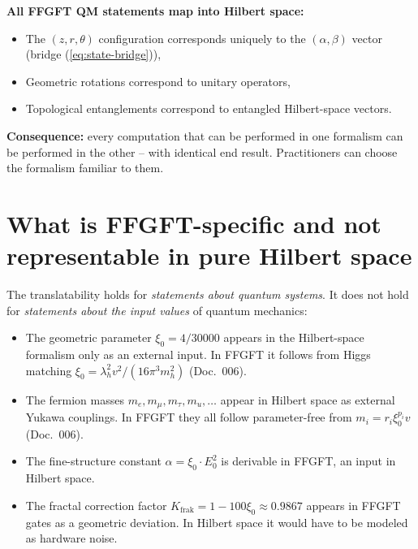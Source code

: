 \textbf{All FFGFT QM statements map into Hilbert space:}
\begin{itemize}[leftmargin=2em,itemsep=2pt,topsep=2pt]
  \item The $(z, r, \theta)$ configuration corresponds uniquely to
        the $(\alpha, \beta)$ vector (bridge (\ref{eq:state-bridge})),
  \item Geometric rotations correspond to unitary operators,
  \item Topological entanglements correspond to entangled
        Hilbert-space vectors.
\end{itemize}

\textbf{Consequence:} every computation that can be performed in one
formalism can be performed in the other -- with identical end
result. Practitioners can choose the formalism familiar to them.

\section{What is FFGFT-specific and not representable in pure Hilbert space}

The translatability holds for \emph{statements about quantum systems}.
It does not hold for \emph{statements about the input values} of
quantum mechanics:

\begin{itemize}[leftmargin=2em,itemsep=2pt,topsep=2pt]
  \item The geometric parameter $\xi_0 = 4/30000$ appears in the
        Hilbert-space formalism only as an external input. In FFGFT
        it follows from Higgs matching $\xi_0 = \lambda_h^2 v^2/
        (16\pi^3 m_h^2)$ (Doc.~006).
  \item The fermion masses $m_e, m_\mu, m_\tau, m_u, \ldots$ appear
        in Hilbert space as external Yukawa couplings. In FFGFT they
        all follow parameter-free from $m_i = r_i \xi_0^{p_i} v$
        (Doc.~006).
  \item The fine-structure constant $\alpha = \xi_0 \cdot E_0^2$ is
        derivable in FFGFT, an input in Hilbert space.
  \item The fractal correction factor $K_{\text{frak}} = 1 -
        100\xi_0 \approx 0.9867$ appears in FFGFT gates as a
        geometric deviation. In Hilbert space it would have to be
        modeled as hardware noise.
\end{itemize}

